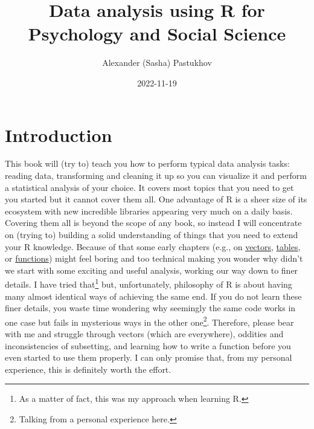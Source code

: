 \documentclass[
]{book}
\title{Data analysis using R for Psychology and Social Science}
\author{Alexander (Sasha) Pastukhov}
\date{2022-11-19}
\begin{document}
\maketitle

{
\setcounter{tocdepth}{1}
\tableofcontents
}
\hypertarget{introduction}{%
\chapter*{Introduction}\label{introduction}}

This book will (try to) teach you how to perform typical data analysis tasks: reading data, transforming and cleaning it up so you can visualize it and perform a statistical analysis of your choice. It covers most topics that you need to get you started but it cannot cover them all. One advantage of R is a sheer size of its ecosystem with new incredible libraries appearing very much on a daily basis. Covering them all is beyond the scope of any book, so instead I will concentrate on (trying to) building a solid understanding of things that you need to extend your R knowledge. Because of that some early chapters (e.g., on \protect\hyperlink{vectors}{vectors}, \protect\hyperlink{tables}{tables}, or \protect\hyperlink{ux5cux23functions}{functions}) might feel boring and too technical making you wonder why didn't we start with some exciting and useful analysis, working our way down to finer details. I have tried that\footnote{As a matter of fact, this was my approach when learning R.} but, unfortunately, philosophy of R is about having many almost identical ways of achieving the same end. If you do not learn these finer details, you waste time wondering why seemingly the same code works in one case but fails in mysterious ways in the other one\footnote{Talking from a personal experience here.}. Therefore, please bear with me and struggle through vectors (which are everywhere), oddities and inconsistencies of subsetting, and learning how to write a function before you even started to use them properly. I can only promise that, from my personal experience, this is definitely worth the effort.
\end{document}
